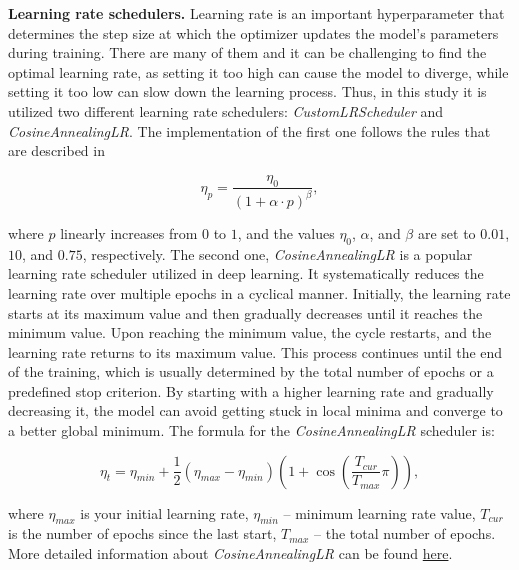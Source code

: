 
\textbf{Learning rate schedulers.} Learning rate is an important hyperparameter that determines the step size at which the optimizer updates the model's parameters during training. There are many of them and it can be challenging to find the optimal learning rate, as setting it too high can cause the model to diverge, while setting it too low can slow down the learning process. Thus, in this study it is utilized two different learning rate schedulers: \textit{CustomLRScheduler} and \textit{CosineAnnealingLR}. The implementation of the first one follows the rules that are described in \cite{ganin2015unsupervised} 

\begin{equation}
    \eta_p = \dfrac{\eta_0}{(1 + \alpha \cdot p)^\beta},
\end{equation}

where $p$ linearly increases from $0$ to $1$, and the values $\eta_0$, $\alpha$, and $\beta$ are set to $0.01$, $10$, and $0.75$, respectively. The second one, \textit{CosineAnnealingLR} is a popular learning rate scheduler utilized in deep learning. It systematically reduces the learning rate over multiple epochs in a cyclical manner. Initially, the learning rate starts at its maximum value and then gradually decreases until it reaches the minimum value. Upon reaching the minimum value, the cycle restarts, and the learning rate returns to its maximum value. This process continues until the end of the training, which is usually determined by the total number of epochs or a predefined stop criterion. By starting with a higher learning rate and gradually decreasing it, the model can avoid getting stuck in local minima and converge to a better global minimum. The formula for the \textit{CosineAnnealingLR} scheduler is:

\begin{equation}
\eta_t = \eta_{min} + \dfrac{1}{2}(\eta_{max} - \eta_{min}) \left(1 + \cos \left( \dfrac{T_{cur}}{T_{max}} \pi \right)\right),
\end{equation}

where $\eta_{max}$ is your initial learning rate, $\eta_{min}$ -- minimum learning rate value, $T_{cur}$ is the number of epochs since the last start, $T_{max}$ -- the total number of epochs. More detailed information about \textit{CosineAnnealingLR} can be found \href{https://pytorch.org/docs/stable/generated/torch.optim.lr_scheduler.CosineAnnealingLR.html}{here}.\\

